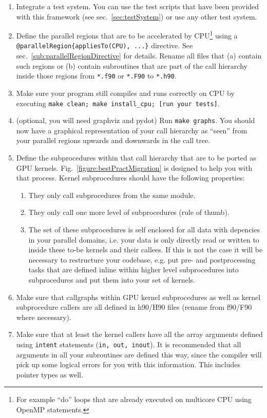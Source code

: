 {\begin{enumerate}
 \item Integrate a test system. You can use the test scripts that have been provided with this framework (see sec.~\ref{sec:testSystem}) or use any other test system.
 \item Define the parallel regions that are to be accelerated by CPU\footnote{For example ``do'' loops that are already executed on multicore CPU using OpenMP statements.} using a \linebreak\verb|@parallelRegion{appliesTo(CPU), ...}| directive. See sec.~\ref{sub:parallelRegionDirective} for details. Rename all files that (a) contain such regions or (b) contain subroutines that are part of the call hierarchy inside those regions from \verb|*.f90| or \verb|*.F90| to \verb|*.h90|.
 \item Make sure your program still compiles and runs correctly on CPU by executing \verb|make clean; make install_cpu; [run your tests]|.
 \item (optional, you will need graphviz and pydot) Run \verb|make graphs|. You should now have a graphical representation of your call hierarchy as ``seen'' from your parallel regions upwards and downwards in the call tree.
 \item Define the subprocedures within that call hierarchy that are to be ported as GPU kernels. Fig.~\ref{figure:bestPractMigration} is designed to help you with that process. Kernel subprocedures should have the following properties:
  \begin{enumerate}
   \item They only call subprocedures from the same module.
   \item They only call one more level of subprocedures (rule of thumb).
   \item The set of these subprocedures is self enclosed for all data with depencies in your parallel domains, i.e. your data is only directly read or written to inside these to-be kernels and their callees. If this is not the case it will be necessary to restructure your codebase, e.g. put pre- and postprocessing tasks that are defined inline within higher level subprocedures into subprocedures and put them into your set of kernels.
  \end{enumerate}
 \item Make sure that callgraphs within GPU kernel subprocedures as well as kernel subprocedure callers are all defined in h90/H90 files (rename from f90/F90 where necessary).
 \item Make sure that at least the kernel callers have all the array arguments defined using \verb|intent| statements (\verb|in, out, inout|). It is recommended that all arguments in all your subroutines are defined this way, since the compiler will pick up some logical errors for you with this information. This includes pointer types as well.

\end{enumerate}}
